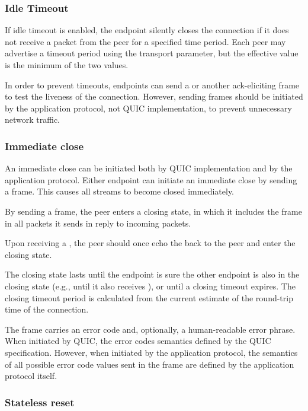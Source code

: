 \subsubsection{Idle Timeout}\label{sec:idle-timeout}

If idle timeout is enabled, the endpoint silently closes the connection if it does not receive a
packet from the peer for a specified time period. Each peer may advertise a timeout period using the
\MaxIdleTimeout{} transport parameter, but the effective value is the minimum of the two
values.

In order to prevent timeouts, endpoints can send a \PING{} or another ack-eliciting frame to test
the liveness of the connection. However, sending \PING{} frames should be initiated by the
application protocol, not QUIC implementation, to prevent unnecessary network traffic.

\subsubsection{Immediate close}

An immediate close can be initiated both by QUIC implementation and by the application protocol.
Either endpoint can initiate an immediate close by sending a \CONNECTIONCLOSE{} frame. This causes
all streams to become closed immediately.

By sending a \CONNECTIONCLOSE{} frame, the peer enters a closing state, in which it includes the
\CONNECTIONCLOSE{} frame in all packets it sends in reply to incoming packets.

Upon receiving a \CONNECTIONCLOSE{}, the peer should once echo the \CONNECTIONCLOSE{} back to the
peer and enter the closing state.

The closing state lasts until the endpoint is sure the other endpoint is also in the closing state
(e.g., until it also receives \CONNECTIONCLOSE{}), or until a closing timeout expires. The closing
timeout period is calculated from the current estimate of the round-trip time of the connection.

The \CONNECTIONCLOSE{} frame carries an error code and, optionally, a human-readable error phrase.
When initiated by QUIC, the error codes semantics defined by the QUIC specification. However, when
initiated by the application protocol, the semantics of all possible error code values sent in the
frame are defined by the application protocol itself.

\subsubsection{Stateless reset}

